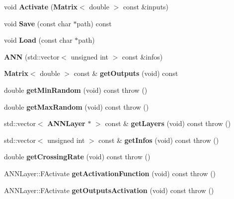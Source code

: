 \begin{DoxyCompactItemize}
\item 
void {\bfseries Activate} ({\bf Matrix}$<$ double $>$ const \&inputs)\label{class_g_a_n_n_1_1_a_n_n_a6e5ff8d7eaf90d7f38547763efcb4ab7}

\item 
void {\bfseries Save} (const char $\ast$path) const \label{class_g_a_n_n_1_1_a_n_n_a523bdbe95d22035e8019868f619aa50e}

\item 
void {\bfseries Load} (const char $\ast$path)\label{class_g_a_n_n_1_1_a_n_n_a6509ae3de47262d62a68056c24d06b92}

\item 
{\bfseries A\+N\+N} (std\+::vector$<$ unsigned int $>$ const \&infos)\label{class_g_a_n_n_1_1_a_n_n_a8b7b98feba4aea412db698035cdcb418}

\item 
{\bf Matrix}$<$ double $>$ const \& {\bfseries get\+Outputs} (void) const \label{class_g_a_n_n_1_1_a_n_n_a0c24550b535019fc04027da71f3e8ebf}

\item 
double {\bfseries get\+Min\+Random} (void) const   throw ()\label{class_g_a_n_n_1_1_a_n_n_a732ada0242d9ac9a9a52c7f0c09ca26a}

\item 
double {\bfseries get\+Max\+Random} (void) const   throw ()\label{class_g_a_n_n_1_1_a_n_n_a3baaedfda1392d8eea5c9a814567626d}

\item 
std\+::vector$<$ {\bf A\+N\+N\+Layer} $\ast$ $>$ const \& {\bfseries get\+Layers} (void) const   throw ()\label{class_g_a_n_n_1_1_a_n_n_a7583e743d7a6d11a36d2b6541b125654}

\item 
std\+::vector$<$ unsigned int $>$ const \& {\bfseries get\+Infos} (void) const   throw ()\label{class_g_a_n_n_1_1_a_n_n_a7524d58a84e19f6dace9fd35a2faf224}

\item 
double {\bfseries get\+Crossing\+Rate} (void) const   throw ()\label{class_g_a_n_n_1_1_a_n_n_a0f0cfbbfd49b831516075cd6360366ad}

\item 
A\+N\+N\+Layer\+::\+F\+Activate {\bfseries get\+Activation\+Function} (void) const   throw ()\label{class_g_a_n_n_1_1_a_n_n_ab94e7f60a43f5bef2314529075a95487}

\item 
A\+N\+N\+Layer\+::\+F\+Activate {\bfseries get\+Outputs\+Activation} (void) const   throw ()\label{class_g_a_n_n_1_1_a_n_n_a26b4cbdcbe8bd55986963b26c2e152ee}


\end{DoxyCompactItemize}
